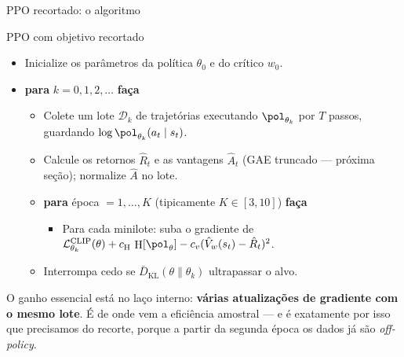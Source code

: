 \documentclass[aspectratio=169, 10pt]{beamer}
\newcommand{\thv}{\theta}
\newcommand{\thk}{\thv_k}
\newcommand{\polth}{\pol_{\thv}}
\newcommand{\Vhat}{\hat{V}}
\newcommand{\Ahat}{\hat{A}}
\DeclareMathOperator{\ent}{H}
\newcommand{\Lclip}{\mathcal{L}^{\mathrm{CLIP}}}
\newcommand{\Dtot}{\mathcal{D}}
\begin{document}
\begin{frame}{PPO recortado: o algoritmo}

  \begin{algbox}{PPO com objetivo recortado}
  \begin{itemize}\setlength{\itemsep}{0.1em}
    \item Inicialize os parâmetros da política $\thv_0$ e do crítico $w_0$.
    \item \textbf{para} $k = 0,1,2,\dots$ \textbf{faça}
      \begin{itemize}\setlength{\itemsep}{0.05em}
        \item Colete um lote $\Dtot_k$ de trajetórias executando $\pol_{\thk}$
          por $T$ passos, guardando $\log\pol_{\thk}(a_t\mid s_t)$.
        \item Calcule os retornos $\hat R_t$ e as vantagens $\Ahat_t$ (GAE
          truncado --- próxima seção); normalize $\Ahat$ no lote.
        \item \textbf{para} época $= 1,\dots,K$ (tipicamente $K \in [3,10]$) \textbf{faça}
          \begin{itemize}\setlength{\itemsep}{0.02em}
            \item Para cada minilote: suba o gradiente de
              $\Lclip_{\thk}(\thv) + c_{\ent}\,\ent[\polth] - c_v (\Vhat_w(s_t)-\hat R_t)^2$.
          \end{itemize}
        \item Interrompa cedo se $\bar{D}_{\mathrm{KL}}(\thv\|\thk)$ ultrapassar o alvo.
      \end{itemize}
  \end{itemize}
  \end{algbox}

  \begin{ideiabox}
    O ganho essencial está no laço interno: \textbf{várias atualizações de gradiente
    com o mesmo lote}. É de onde vem a eficiência amostral --- e é exatamente por
    isso que precisamos do recorte, porque a partir da segunda época os dados já são
    \emph{off-policy}.
  \end{ideiabox}
\end{frame}
\end{document}
